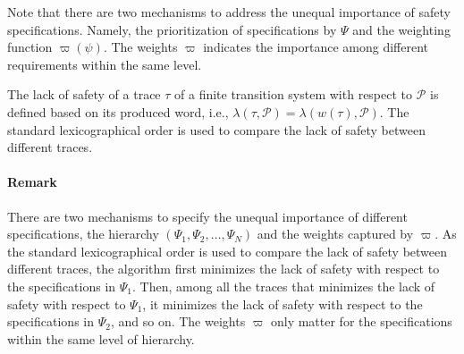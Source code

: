 Note that there are two mechanisms to address the unequal importance of safety specifications. Namely, the prioritization of specifications by $\Psi$ and the weighting function $\varpi(\psi)$.  The weights $\varpi$ indicates the importance among different requirements within the same level.

The lack of safety of a trace $\tau$ of a finite transition system with respect to $\mathcal{P}$
is defined based on its produced word, i.e., $\lambda(\tau, \mathcal{P}) = \lambda(w(\tau), \mathcal{P})$.
The standard lexicographical order is used to compare the lack of safety between different traces.

\paragraph{Remark}
There are two mechanisms to specify the unequal importance of different specifications, the hierarchy $(\Psi_1, \Psi_2, \ldots, \Psi_N)$ and the weights captured by $\varpi$.
As the standard lexicographical order is used to compare the lack of safety between different traces, the algorithm first minimizes the lack of safety with respect to the specifications in $\Psi_1$.
Then, among all the traces that minimizes the lack of safety with respect to $\Psi_1$, it minimizes the lack of safety with respect to the specifications in $\Psi_2$, and so on.
The weights $\varpi$ only matter for the specifications within the same level of hierarchy.